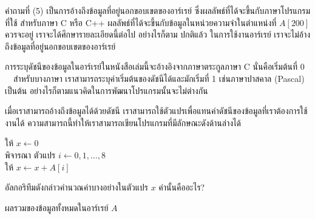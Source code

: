 คำ{\wbr}ถาม{\wbr}ที่ (5) เป็น{\wbr}การ{\wbr}อ้าง{\wbr}ถึง{\wbr}ข้อมูล{\wbr}ที่{\wbr}อยู่{\wbr}นอก{\wbr}ขอบเขต{\wbr}ของ{\wbr}อาร์{\wbr}เรย์
ซึ่ง{\wbr}ผลลัพธ์{\wbr}ที่{\wbr}ได้{\wbr}จะ{\wbr}ขึ้น{\wbr}กับ{\wbr}ภาษา{\wbr}โปรแกรม{\wbr}ที่{\wbr}ใช้ สำหรับ{\wbr}ภาษา C หรือ C++
ผลลัพธ์{\wbr}ที่{\wbr}ได้{\wbr}จะ{\wbr}ขึ้น{\wbr}กับ{\wbr}ข้อมูล{\wbr}ใน{\wbr}หน่วย{\wbr}ความ{\wbr}จำ{\wbr}ใน{\wbr}ตำแหน่ง{\wbr}ที่ $A[200]$ ควร{\wbr}จะ{\wbr}อยู่{\wbr}
เรา{\wbr}จะ{\wbr}ได้{\wbr}ศึกษา{\wbr}รายละเอียด{\wbr}นี้{\wbr}ต่อ{\wbr}ไป อย่างไร{\wbr}ก็{\wbr}ตาม ปกติ{\wbr}แล้ว ใน{\wbr}การ{\wbr}ใช้งาน{\wbr}อาร์{\wbr}เรย์
เรา{\wbr}จะ{\wbr}ไม่{\wbr}อ้าง{\wbr}ถึง{\wbr}ข้อมูล{\wbr}ที่{\wbr}อยู่{\wbr}นอก{\wbr}ขอบเขต{\wbr}ของ{\wbr}อาร์{\wbr}เรย์

การ{\wbr}ระบุ{\wbr}ดัชนี{\wbr}ของ{\wbr}ข้อมูล{\wbr}ใน{\wbr}อาร์{\wbr}เรย์{\wbr}ใน{\wbr}หนังสือ{\wbr}เล่ม{\wbr}นี้{\wbr}จะ{\wbr}อ้างอิง{\wbr}จาก{\wbr}ภาษา{\wbr}ตระกูล{\wbr}ภาษา C
นั่น{\wbr}คือ{\wbr}เริ่มต้น{\wbr}ที่ 0 \ \ สำหรับ{\wbr}บาง{\wbr}ภาษา เรา{\wbr}สามารถ{\wbr}ระบุ{\wbr}ค่า{\wbr}เริ่มต้น{\wbr}ของ{\wbr}ดัชนี{\wbr}ได้{\wbr}และ{\wbr}มัก{\wbr}เริ่ม{\wbr}ที่ 1
เช่น{\wbr}ภาษา{\wbr}ปาสคาล (Pascal) เป็นต้น{\wbr}
อย่างไร{\wbr}ก็{\wbr}ตาม{\wbr}แนวคิด{\wbr}ใน{\wbr}การ{\wbr}พัฒนา{\wbr}โปรแกรม{\wbr}นั้น{\wbr}จะ{\wbr}ไม่{\wbr}ต่าง{\wbr}กัน{\wbr}

เมื่อ{\wbr}เรา{\wbr}สามารถ{\wbr}อ้าง{\wbr}ถึง{\wbr}ข้อมูล{\wbr}ได้{\wbr}ด้วย{\wbr}ดัชนี{\wbr}
เรา{\wbr}สามารถ{\wbr}ใช้{\wbr}ตัวแปร{\wbr}เพื่อ{\wbr}แทน{\wbr}ค่า{\wbr}ดัชนี{\wbr}ของ{\wbr}ข้อมูล{\wbr}ที่{\wbr}เรา{\wbr}ต้องการ{\wbr}ใช้งาน{\wbr}ได้{\wbr}
ความ{\wbr}สามารถ{\wbr}นี้{\wbr}ทำให้{\wbr}เรา{\wbr}สามารถ{\wbr}เขียน{\wbr}โปรแกรม{\wbr}ที่{\wbr}มี{\wbr}ลักษณะ{\wbr}ดัง{\wbr}ด้าน{\wbr}ล่าง{\wbr}ได้{\wbr}

\begin{algt}
\label{alg:array-sum1}
\noindent \hspace*{0.2in} ให้ $x\leftarrow 0$\\
\hspace*{0.2in} พิจารณา ตัวแปร $i\leftarrow 0,1,\ldots,8$\\
\hspace*{0.2in}\hspace*{0.2in} ให้ $x \leftarrow x + A[i]$
\end{algt}

\begin{quiz}{}
อัลกอริทึม{\wbr}ดัง{\wbr}กล่าว{\wbr}คำนวณ{\wbr}ค่า{\wbr}บาง{\wbr}อย่าง{\wbr}ใน{\wbr}ตัวแปร $x$ ค่า{\wbr}นั้น{\wbr}คือ{\wbr}อะไร?
\end{quiz}
\begin{quizans}
ผล{\wbr}รวม{\wbr}ของ{\wbr}ข้อมูล{\wbr}ทั้งหมด{\wbr}ใน{\wbr}อาร์{\wbr}เรย์ $A$
\end{quizans}

